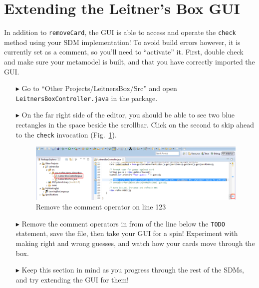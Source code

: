 \newpage
\hypertarget{sec:extendGui}{}
\section{Extending the Leitner's Box GUI}
\genHeader

\vspace{0.5cm}

In addition to \texttt{removeCard}, the GUI is able to access and operate the \texttt{check} method using your SDM implementation! To avoid build errors
however, it is currently set as a comment, so you'll need to ``activate'' it. First, double check and make sure your metamodel is built, and that you have
correctly imported the GUI.

\begin{itemize}

\item[$\blacktriangleright$] Go to ``Other Projects/LeitnersBox/Src'' and open \texttt{Leitners\-Box\-Cont\-roller\-.java} in the package.

\vspace{0.5cm}

\item[$\blacktriangleright$] On the far right side of the editor, you should be able to see two blue rectangles in the space beside the scrollbar. Click on the
second to skip ahead to the \texttt{check} invocation (Fig.~\ref{fig:remComment}).

\vspace{0.5cm}

\begin{figure}[htp]
\begin{center}
  \includegraphics[width=\textwidth]{eclipse_GUICommentLine}
  \caption{Remove the comment operator on line 123}
  \label{fig:remComment}
\end{center}
\end{figure}

\vspace{0.5cm}

\item[$\blacktriangleright$] Remove the comment operators in from of the line below the \texttt{TODO} statement, save the file, then take your GUI for a spin!
Experiment with making right and wrong guesses, and watch how your cards move through the box. 

\item[$\blacktriangleright$] Keep this section in mind as you progress through the rest of the SDMs, and try extending the GUI for them!

\end{itemize}
